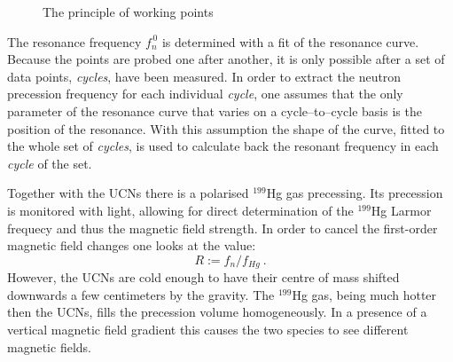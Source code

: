 \begin{figure}[bth]
  \myfloatalign
  \quad
  \caption{The principle of working points}
  \label{fig:axions_working_points}
\end{figure}

The resonance frequency $f_n^{\,0}$ is determined with a fit of the resonance curve. Because the points are probed one after another, it is only possible after a set of data points, \emph{cycles}, have been measured. In order to extract the neutron precession frequency for each individual \emph{cycle}, one assumes that the only parameter of the resonance curve that varies on a cycle--to--cycle basis is the position of the resonance. With this assumption the shape of the curve, fitted to the whole set of \emph{cycles}, is used to calculate back the resonant frequency in each \emph{cycle} of the set.

Together with the UCNs there is a polarised $^{199}$Hg gas precessing. Its precession is monitored with light, allowing for direct determination of the $^{199}$Hg Larmor frequecy and thus the magnetic field strength. In order to cancel the first-order magnetic field changes one looks at the value:
\begin{equation}
  R := f_n / f_{Hg} \ .
\end{equation}
However, the UCNs are cold enough to have their centre of mass shifted downwards a few centimeters by the gravity. The $^{199}$Hg gas, being much hotter then the UCNs, fills the precession volume homogeneously. In a presence of a vertical magnetic field gradient this causes the two species to see different magnetic fields.

